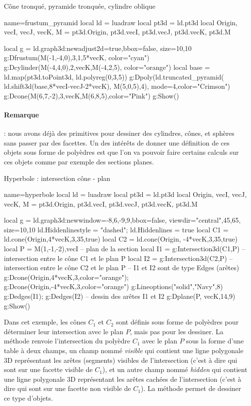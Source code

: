 \begin{demo}{Cône tronqué, pyramide tronquée, cylindre oblique}
\begin{luadraw}{name=frustum_pyramid}
local ld = luadraw
local pt3d = ld.pt3d
local Origin, vecI, vecJ, vecK, M = pt3d.Origin, pt3d.vecI, pt3d.vecJ, pt3d.vecK, pt3d.M

local g = ld.graph3d:new{adjust2d=true,bbox=false, size={10,10} }
g:Dfrustum(M(-1,-4,0),3,1,5*vecK, {color="cyan"})
g:Dcylinder(M(-4,4,0),2,vecK,M(-4,2,5), {color="orange"})
local base = ld.map(pt3d.toPoint3d, ld.polyreg(0,3,5))
g:Dpoly(ld.truncated_pyramid( ld.shift3d(base,8*vecI-vecJ-2*vecK), M(5,0,5),4), {mode=4,color="Crimson"})
g:Dcone(M(6,7,-2),3,vecK,M(6,8,5),{color="Pink"})
g:Show()
\end{luadraw}
\end{demo}

\paragraph{Remarque} : nous avons déjà des primitives pour dessiner des cylindres, cônes, et sphères sans passer par des facettes. Un des intérêts de donner une définition de ces objets sous forme de polyèdres est que l'on va pouvoir faire certains calculs sur ces objets comme par exemple des sections planes.

\begin{demo}{Hyperbole : intersection cône - plan}
\begin{luadraw}{name=hyperbole}
local ld = luadraw
local pt3d = ld.pt3d
local Origin, vecI, vecJ, vecK, M = pt3d.Origin, pt3d.vecI, pt3d.vecJ, pt3d.vecK, pt3d.M

local g = ld.graph3d:new{window={-8,6,-9,9},bbox=false, 
    viewdir={"central",45,65}, size={10,10}}
ld.Hiddenlinestyle = "dashed"; ld.Hiddenlines = true
local C1 = ld.cone(Origin,4*vecK,3,35,true)
local C2 = ld.cone(Origin, -4*vecK,3,35,true)
local P = {M(1,-1,-2),vecI} -- plan de la section
local I1 = g:Intersection3d(C1,P) -- intersection entre le cône C1 et le plan P
local I2 = g:Intersection3d(C2,P) -- intersection entre le cône C2 et le plan P
-- I1 et I2 sont de type Edges (arêtes)
g:Dcone(Origin,4*vecK,3,{color="orange"}); g:Dcone(Origin,-4*vecK,3,{color="orange"})
g:Lineoptions("solid","Navy",8)
g:Dedges(I1); g:Dedges(I2) -- dessin des arêtes I1 et I2
g:Dplane(P, vecK,14,9)
g:Show()
\end{luadraw}
\end{demo}

Dans cet exemple, les cônes $C_1$ et $C_2$ sont définis sous forme de polyèdres pour déterminer leur intersection avec le plan $P$, mais pas pour les dessiner. La méthode  renvoie l'intersection du polyèdre $C_1$ avec le plan $P$ sous la forme d'une table à deux champs, un champ nommé \emph{visible} qui contient une ligne polygonale 3D représentant les arêtes (segments) visibles de l'intersection (c'est à dire qui sont sur une facette visible de $C_1$), et un autre champ nommé \emph{hidden} qui contient une ligne polygonale 3D représentant les arêtes cachées de l'intersection (c'est à dire qui sont sur une facette non visible de $C_1$). La méthode  permet de dessiner ce type d'objets.

